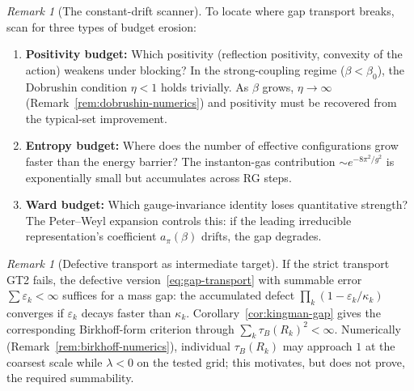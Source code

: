 \documentclass[12pt,a4paper]{article}
\theoremstyle{definition}
\theoremstyle{plain}
\theoremstyle{remark}
\newtheorem{remark}[definition]{Remark}
\begin{document}
\begin{remark}[The constant-drift scanner]\label{rem:drift-scanner}
To locate where gap transport breaks, scan for three types of budget erosion:
\begin{enumerate}
\item \textbf{Positivity budget:} Which positivity (reflection positivity, convexity of the action) weakens under blocking? In the strong-coupling regime ($\beta < \beta_0$), the Dobrushin condition $\eta < 1$ holds trivially. As $\beta$ grows, $\eta \to \infty$ (Remark~\ref{rem:dobrushin-numerics}) and positivity must be recovered from the typical-set improvement.
\item \textbf{Entropy budget:} Where does the number of effective configurations grow faster than the energy barrier? The instanton-gas contribution $\sim e^{-8\pi^2/g^2}$ is exponentially small but accumulates across RG steps.
\item \textbf{Ward budget:} Which gauge-invariance identity loses quantitative strength? The Peter--Weyl expansion controls this: if the leading irreducible representation's coefficient $a_\pi(\beta)$ drifts, the gap degrades.
\end{enumerate}
\end{remark}

\begin{remark}[Defective transport as intermediate target]\label{rem:defective-transport}
If the strict transport GT2 fails, the defective version~\eqref{eq:gap-transport} with summable error $\sum \varepsilon_k < \infty$ suffices for a mass gap: the accumulated defect $\prod_k (1 - \varepsilon_k / \kappa_k)$ converges if $\varepsilon_k$ decays faster than $\kappa_k$. Corollary~\ref{cor:kingman-gap} gives the corresponding Birkhoff-form criterion through $\sum_k\tau_B(R_k)^2<\infty$. Numerically (Remark~\ref{rem:birkhoff-numerics}), individual $\tau_B(R_k)$ may approach $1$ at the coarsest scale while $\lambda < 0$ on the tested grid; this motivates, but does not prove, the required summability.
\end{remark}
\end{document}
